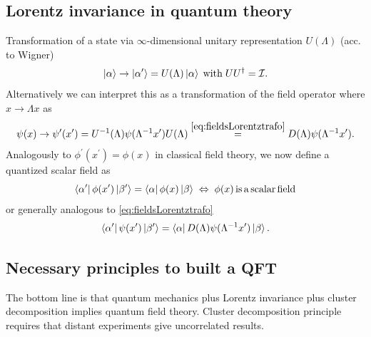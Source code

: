 \subsection{Lorentz invariance in quantum theory}
Transformation of a state via $\infty$-dimensional unitary representation $U(\Lambda)$ (acc. to Wigner)
\begin{equation}
	\ket{\alpha}\rightarrow \ket{\alpha^\prime} = U(\Lambda) \ket{\alpha} \;\mathrm{with}\; UU^\dagger = \mathcal{I}.
\end{equation}
Alternatively we can interpret this as a transformation of the field operator where $x\rightarrow\Lambda x$ as
\begin{equation}
	\psi(x) \rightarrow \psi^\prime(x^\prime) = U^{-1}(\Lambda)\psi(\Lambda^{-1} x^\prime) U(\Lambda) \stackrel{\ref{eq:fieldsLorentztrafo}}{=} D(\Lambda) \psi(\Lambda^{-1}x^\prime).
\end{equation}
Analogously to $\phi^\prime(x^\prime) = \phi(x)$ in classical field theory, we now define a quantized scalar field as
\begin{equation}
	\bra{\alpha^\prime}\phi(x^\prime) \ket{\beta^\prime} = \bra{\alpha} \phi(x) \ket{\beta} \; \Leftrightarrow\; \phi(x) \mathrm{\,is\,a\,scalar\,field}
\end{equation}
or generally analogous to  \ref{eq:fieldsLorentztrafo}
\begin{equation}
	\bra{\alpha^\prime}\psi(x^\prime)\ket{\beta^\prime} = \bra{\alpha}D(\Lambda) \psi(\Lambda^{-1} x^\prime)\ket{\beta}.
\end{equation}
\subsection{Necessary principles to built a QFT}
The bottom line is that quantum mechanics plus Lorentz invariance plus cluster decomposition implies quantum field theory. Cluster decomposition principle requires that distant
experiments give uncorrelated results.










